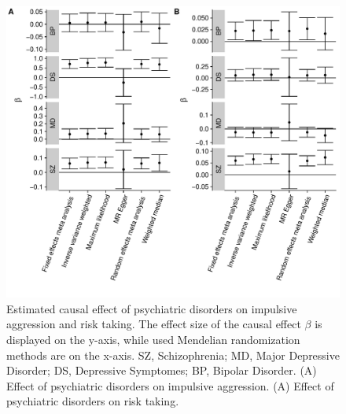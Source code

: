 \begin{figure}[htpb]
  \centering
  \includegraphics[width=0.9\linewidth]{figures/overall_mr_effect.pdf}
  \caption{Estimated causal effect of psychiatric disorders on impulsive aggression and risk taking.
    The effect size of the causal effect $\beta$ is displayed on the y-axis, while used Mendelian randomization methods are on the x-axis.
    SZ, Schizophrenia; MD, Major Depressive Disorder; DS, Depressive Symptomes; BP, Bipolar Disorder.
    (A) Effect of psychiatric disorders on impulsive aggression.
    (A) Effect of psychiatric disorders on risk taking.
  }\label{fig:overall_mr_effect}
\end{figure}
